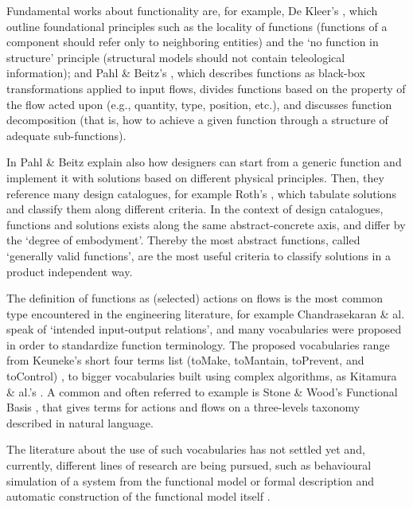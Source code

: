 \documentclass[sw]{iosart2x}
\newcommand{\quotes}[1]{`#1'}
\begin{document}
Fundamental works about functionality are, for example, De Kleer's \cite{de_kleer_how_1984, kleer_qualitative_1984}, which outline foundational principles such as the locality of functions (functions of a component should refer only to neighboring entities) and the \quotes{no function in structure} principle (structural models should not contain teleological information); and Pahl \& Beitz's \cite{pahl_engineering_2007}, which describes functions as black-box transformations applied to input flows, divides functions based on the property of the flow acted upon (e.g., quantity, type, position, etc.), and discusses function decomposition (that is, how to achieve a given function through a structure of adequate sub-functions).

In \cite{pahl_engineering_2007} Pahl \& Beitz explain also how designers can start from a generic function and implement it with solutions based on different physical principles. 
Then, they reference many design catalogues, for example Roth's \cite{rothKonstruierenMitKonstruktionskatalogen2000}, which tabulate solutions and classify them along different criteria.
In the context of design catalogues, functions and solutions exists along the same abstract-concrete axis, and differ by the \quotes{degree of embodyment}. 
Thereby the most abstract functions, called \quotes{generally valid functions}, are the most useful criteria to classify solutions in a product independent way. 

The definition of functions as (selected) actions on flows is the most common type encountered in the engineering literature, for example Chandrasekaran \& al. \cite{chandrasekaranFunctionalRepresentationDesign1993} speak of \quotes{intended input-output relations}, and many vocabularies were proposed in order to standardize function terminology. 
The proposed vocabularies range from Keuneke's short four terms list (toMake, toMantain, toPrevent, and toControl) \cite{keuneke_device_1991}, to bigger vocabularies built using complex algorithms, as Kitamura \& al.'s \cite{kitamuraFunctionalConceptOntology2002a}. 
A common and often referred to example is Stone \& Wood's Functional Basis \cite{hirtz_functional_2002, stone_development_2000}, that gives terms for actions and flows on a three-levels taxonomy described in natural language.

The literature about the use of such vocabularies has not settled yet and, currently, different lines of research are being pursued, such as behavioural simulation of a system from the functional model \cite{kurtogluGraphBasedFaultIdentification2008} or formal description and automatic construction of the functional model itself \cite{gill_logic_2021,kurtoglu_automating_2010}.
\end{document}
